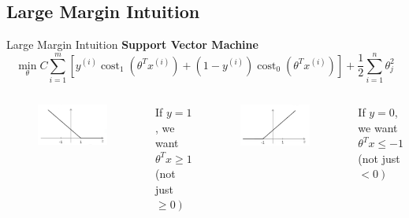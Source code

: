 \documentclass[9pt,dvipsnames]{beamer}
\begin{document}
\subsection{Large Margin Intuition}
\begin{frame}{Large Margin Intuition}
	\textbf{Support Vector Machine}
	$$
		\min _\theta C \sum_{i=1}^m\left[y^{(i)} \operatorname{cost}_1\left(\theta^T x^{(i)}\right)+\left(1-y^{(i)}\right) \operatorname{cost}_0\left(\theta^T x^{(i)}\right)\right]+\frac{1}{2} \sum_{i=1}^n \theta_j^2
	$$
	\begin{columns}
		\begin{figure}
			\centering
			\includegraphics[width=\textwidth]{imgs/svm_4.png}
		\end{figure}
		If \(y=1\), we want \(\theta^{T} x \geq 1\) (not just \(\left.\geq 0\right)\)
		
		\begin{figure}
			\centering
			\includegraphics[width=\textwidth]{imgs/svm_5.png}
		\end{figure}
		If \(y=0\), we want \(\theta^{T} x \leq-1\) (not just \(\left.<0\right)\)
	\end{columns}
\end{frame}
\end{document}
